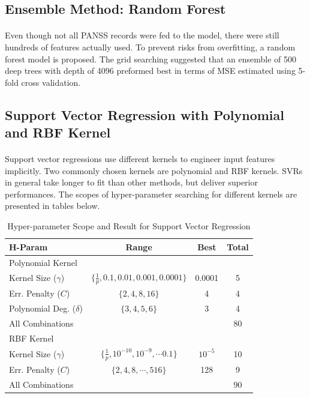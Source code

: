 \documentclass[11pt]{article}
\begin{document}
	\subsection{Ensemble Method: Random Forest}
	\paragraph{} Even though not all PANSS records were fed to the model, there were still hundreds of features actually used. To prevent risks from overfitting, a random forest model is proposed. The grid searching suggested that an ensemble of 500 deep trees with depth of 4096 preformed best in terms of MSE estimated using 5-fold cross validation.

	\subsection{Support Vector Regression with Polynomial and RBF Kernel}
	\paragraph{} Support vector regressions use different kernels to engineer input features implicitly. Two commonly chosen kernels are polynomial and RBF kernels. SVRs in general take longer to fit than other methods, but deliver superior performances. The scopes of hyper-parameter searching for different kernels are presented in tables below.
	\begin{table}[H]
		\centering
		\begin{tabular}{l|c|c|c}
 		H-Param & Range & Best & Total \\
 		\hline
 		\hline
 		Polynomial Kernel \\
 		\hline
 		Kernel Size ($\gamma$) & $\{\frac{1}{p}, 0.1, 0.01, 0.001, 0.0001\}$ & 0.0001 & 5 \\
 		Err. Penalty ($C$)& $\{2, 4, 8, 16\}$ & 4 & 4 \\
 		Polynomial Deg. ($\delta$)& $\{3, 4, 5, 6\}$ & 3 & 4 \\
 		\hline
 		All Combinations & & & 80 \\
 		\hline
 		\hline
 		RBF Kernel \\
 		\hline
 		Kernel Size ($\gamma$) & $\{\frac{1}{p}, 10^{-10}, 10^{-9}, \cdots 0.1\}$ & $10^{-5}$ & 10 \\
 		Err. Penalty ($C$)& $\{2, 4, 8, \cdots, 516\}$ & 128 & 9 \\
 		\hline
 		All Combinations & & & 90
		\end{tabular}
		\caption{Hyper-parameter Scope and Result for Support Vector Regression}
	\end{table}
\end{document}
